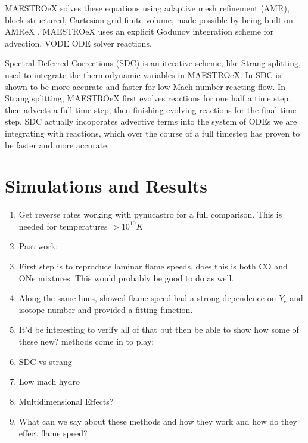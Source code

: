 \documentclass[preprint,times,tighten]{aastex63}
\begin{document}
MAESTROeX solves these equations using adaptive mesh refinement (AMR), block-structured, Cartesian grid finite-volume, made possible by being built on AMReX \citep{amrex_joss}. MAESTROeX uses an explicit Godunov integration scheme for advection, VODE \citep{vode} ODE solver reactions.

Spectral Deferred Corrections (SDC) is an iterative scheme, like Strang splitting, used to integrate the thermodynamic variables in MAESTROeX. In \cite{SDC-old} SDC is shown to be more accurate and faster for low Mach number reacting flow. In Strang splitting, MAESTROeX first evolves reactions for one half a time step, then advects a full time step, then finishing evolving reactions for the final time step. SDC actually incoporates advective terms into the system of ODEs we are integrating with reactions, which over the course of a full timestep has proven to be faster and more accurate. 


\section{Simulations and Results}\label{Sec:results}
\begin{enumerate}

  \item Get reverse rates working with pynucastro for a full comparison. This is needed for temperatures $> 10^{10} K$
  \item Past work:
  \item First step is to reproduce \cite{TW92} laminar flame speeds.    \cite{Schwab_2020} does this is both CO and ONe mixtures. This would probably be good to do as well.
  \item Along the same lines, \cite{Schwab_2020} showed flame speed had a strong dependence on $Y_e$ and isotope number and provided a fitting function.
  \item It'd be interesting to verify all of that but then be able to show how some of these new? methods come in to play:
  \item SDC vs strang
  \item Low mach hydro
  \item Multidimensional Effects?
  \item What can we say about these methods and how they work and how do they effect flame speed?
\end{enumerate}
\end{document}
